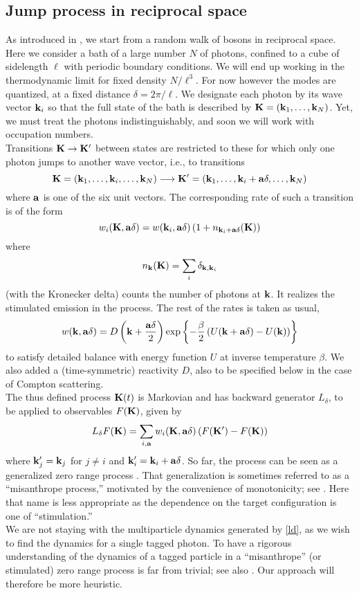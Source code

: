 \documentclass[a4paper,12pt,reqno,superscriptaddress,nofootinbib]{revtex4}
\newcommand{\0}{^{(0)}}
\newcommand{\1}{^{(1)}}
\newcommand{\2}{^{(2)}}
\begin{document}
\subsection{Jump process in reciprocal space}

As introduced in \cite{paper}, we start from a random walk of bosons in reciprocal space. Here we consider a bath of a large number $N$ of photons, confined to a cube of sidelength $\ell$ with 
periodic boundary conditions. We will end up working in the thermodynamic limit for fixed density $N/\ell^3$.  For now however the modes are quantized, at a fixed distance $\delta = 2\pi / \ell$.  We designate each photon by its wave vector $\vb{k}_i$ so that the full state of the bath is described by $\vb{K} = (\vb{k}_1, \dots, \vb{k}_N)$.  Yet, we must treat the photons indistinguishably, and soon we will work with occupation numbers.\\
Transitions $\vb{K}\rightarrow \vb{K}'$ between  states are restricted to 
these for which only one photon jumps to another wave vector, i.e., to transitions
\[
\vb{K} = (\vb{k}_1, 
\dots,\vb{k}_i,\ldots, \vb{k}_N)\longrightarrow \vb{K}' = (\vb{k}_1, 
\dots, \vb{k}_i+\vb{a} \delta,\dots, \vb{k}_N)
\] 
where $\vb{a}$ is one of the six unit vectors. The corresponding rate of such a transition is of the form
\[
w_i(\vb{K}, \vb{a}\delta) = w(\vb{k}_i,\vb{a}\delta) \left(1 + n_{\vb{k}_i+\vb{a} \delta}(\vb{K} )\right)
\]
where
\[
n_{\vb{k}}(\vb{K}) = \sum_{i} \delta_{ \vb{k}, \vb{k}_i}
\]
(with the Kronecker delta) counts the number of photons at $\vb{k}$.  It realizes the stimulated emission in the process.  The rest of the rates is taken as usual,
\[
w(\vb{k},\vb{a}\delta) = D\left( \vb{k} + \frac{\vb{a} \delta}{2} \right)
\exp\left\{-\frac{\beta}{2}\left(U(\vb{k} + \vb{a} \delta) - 
U(\vb{k})\right)\right\}
\]
to satisfy detailed balance with energy function $U$ at inverse temperature $\beta$.   We also added a (time-symmetric) reactivity $D$, also to be specified below in the case of Compton scattering.\\

The thus defined process $\vb{K}(t)$ is Markovian and has backward generator $L_\delta$, to be applied to observables
$F(\vb{K})$, given by
\begin{equation}\label{ld}
L_\delta F(\vb{K})= \sum_{i,\vb{a}} w_i(\vb{K},\vb{a}\delta) \left(F(\vb{K}') 
-F(\vb{K})\right)
\end{equation}
where $\vb{k}'_j = \vb{k}_j$ for $j \neq i$ and 
$\vb{k}'_i = \vb{k}_i + \vb{a} \delta$.
So far, the process can be seen as a generalized zero range process \cite{blythe}.  That generalization is sometimes referred to as a ``misanthrope process,'' motivated by the convenience of monotonicity; see \cite{cocozza,sethuraman}.  Here that name is less appropriate as the dependence on the target configuration is one of ``stimulation.'' \\
We are not staying with the multiparticle dynamics generated by \eqref{ld}, as we wish to find the dynamics for a single tagged photon.  To have a rigorous understanding of the dynamics of a tagged particle in a ``misanthrope'' (or stimulated) zero range process is far from trivial; see also \cite{jara}.  Our approach will therefore be more heuristic.\\
\end{document}
